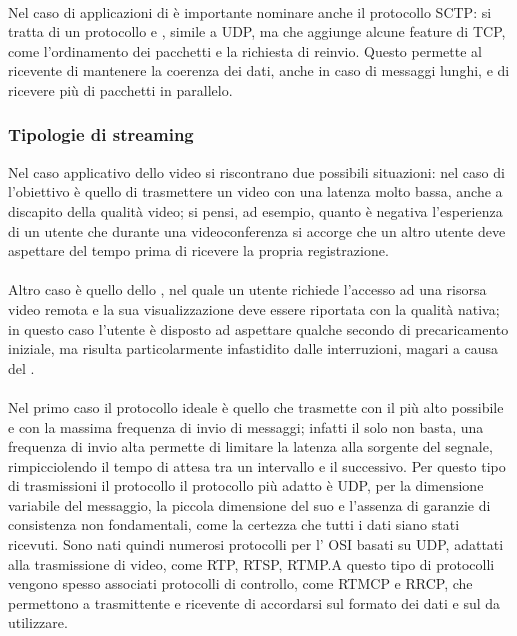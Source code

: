 			\paragraph*{}
			Nel caso di applicazioni di  è importante nominare anche il protocollo \gls{SCTP}: si tratta di un protocollo  e , simile a \gls{UDP}, ma che aggiunge alcune feature di \gls{TCP}, come l'ordinamento dei pacchetti e la richiesta di reinvio. Questo permette al ricevente di mantenere la coerenza dei dati, anche in caso di messaggi lunghi, e di ricevere più  di pacchetti in parallelo.

		\subsubsection{Tipologie di streaming}
			Nel caso applicativo dello  video si riscontrano due possibili situazioni:
			nel caso di   l'obiettivo è quello di trasmettere un video con una latenza molto bassa, anche a discapito della qualità video; si pensi, ad esempio, quanto è negativa l'esperienza di un utente che durante una videoconferenza si accorge che un altro utente deve aspettare del tempo prima di ricevere la propria registrazione.
			\paragraph*{}
			Altro caso è quello dello  , nel quale un utente richiede l'accesso ad una risorsa video remota e la sua visualizzazione deve essere riportata con la qualità nativa; in questo caso l'utente è disposto ad aspettare qualche secondo di precaricamento iniziale, ma risulta particolarmente infastidito dalle interruzioni, magari a causa del .
			\paragraph*{}
			Nel primo caso il protocollo ideale è quello che trasmette con il  più alto possibile e con la massima frequenza di invio di messaggi; infatti il solo  non basta, una frequenza di invio alta permette di limitare la latenza alla sorgente del segnale, rimpicciolendo il tempo di attesa tra un intervallo e il successivo. Per questo tipo di trasmissioni il protocollo il protocollo più adatto è \gls{UDP}, per la dimensione variabile del messaggio, la piccola dimensione del suo  e l'assenza di garanzie di consistenza non fondamentali, come la certezza che tutti i dati siano stati ricevuti. Sono nati quindi numerosi protocolli per l' \gls{OSI} basati su \gls{UDP}, adattati alla trasmissione di  video, come \gls{RTP}, \gls{RTSP}, \gls{RTMP}.\@ A questo tipo di protocolli vengono spesso associati protocolli di controllo, come \gls{RTMCP} e \gls{RRCP}, che permettono a trasmittente e ricevente di accordarsi sul formato dei dati e sul  da utilizzare.
